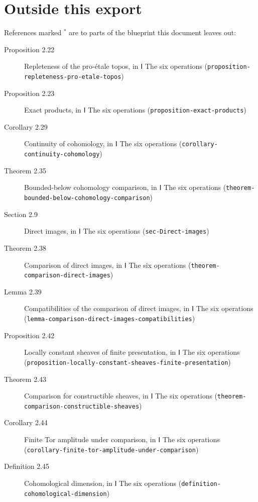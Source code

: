 \documentclass[11pt]{article}
\newcommand{\bpslug}[1]{\texttt{#1}}
\begin{document}
\section*{Outside this export}
References marked \ensuremath{{}^\ast} are to parts of the blueprint this document leaves out:
\begin{description}
\item[Proposition 2.22] Repleteness of the pro-étale topos, in Ⅰ The six operations (\bpslug{proposition-{}\allowbreak{}repleteness-{}\allowbreak{}pro-{}\allowbreak{}etale-{}\allowbreak{}topos})
\item[Proposition 2.23] Exact products, in Ⅰ The six operations (\bpslug{proposition-{}\allowbreak{}exact-{}\allowbreak{}products})
\item[Corollary 2.29] Continuity of cohomology, in Ⅰ The six operations (\bpslug{corollary-{}\allowbreak{}continuity-{}\allowbreak{}cohomology})
\item[Theorem 2.35] Bounded-below cohomology comparison, in Ⅰ The six operations (\bpslug{theorem-{}\allowbreak{}bounded-{}\allowbreak{}below-{}\allowbreak{}cohomology-{}\allowbreak{}comparison})
\item[Section 2.9] Direct images, in Ⅰ The six operations (\bpslug{sec-{}\allowbreak{}Direct-{}\allowbreak{}images})
\item[Theorem 2.38] Comparison of direct images, in Ⅰ The six operations (\bpslug{theorem-{}\allowbreak{}comparison-{}\allowbreak{}direct-{}\allowbreak{}images})
\item[Lemma 2.39] Compatibilities of the comparison of direct images, in Ⅰ The six operations (\bpslug{lemma-{}\allowbreak{}comparison-{}\allowbreak{}direct-{}\allowbreak{}images-{}\allowbreak{}compatibilities})
\item[Proposition 2.42] Locally constant sheaves of finite presentation, in Ⅰ The six operations (\bpslug{proposition-{}\allowbreak{}locally-{}\allowbreak{}constant-{}\allowbreak{}sheaves-{}\allowbreak{}finite-{}\allowbreak{}presentation})
\item[Theorem 2.43] Comparison for constructible sheaves, in Ⅰ The six operations (\bpslug{theorem-{}\allowbreak{}comparison-{}\allowbreak{}constructible-{}\allowbreak{}sheaves})
\item[Corollary 2.44] Finite Tor amplitude under comparison, in Ⅰ The six operations (\bpslug{corollary-{}\allowbreak{}finite-{}\allowbreak{}tor-{}\allowbreak{}amplitude-{}\allowbreak{}under-{}\allowbreak{}comparison})
\item[Definition 2.45] Cohomological dimension, in Ⅰ The six operations (\bpslug{definition-{}\allowbreak{}cohomological-{}\allowbreak{}dimension})

\end{description}
\end{document}
